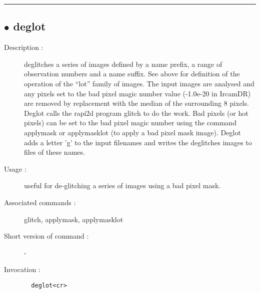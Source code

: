 \hrule \subsection*{$\bullet$ deglot}
\begin{description}
\item[Description :] deglitches a series of images defined by a name prefix, a range
of observation numbers and a name suffix.  See above for definition of the
operation of the ``lot'' family of images.  The input images are analysed
and any pixels set to the bad pixel magic number value (-1.0e-20 in
IrcamDR) are removed by replacement with the median of the surrounding 8
pixels.  Deglot calls the rapi2d program glitch to do the work.  Bad
pixels (or hot pixels) can be set to the bad pixel magic number using the
command applymask or applymasklot (to apply a bad pixel mask image).
Deglot adds a letter 'g' to the input filenames and writes the deglitches
images to files of these names. 
\item[Usage :] useful for de-glitching a series of images using a bad pixel
mask.
\item[Associated commands :] glitch, applymask, applymasklot
\item[Short version of command :] -
\item[Invocation :]

\verb+  deglot<cr> +\end{description}

